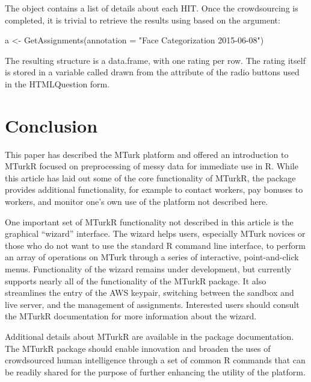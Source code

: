 \noindent The  object contains a list of details about each HIT. Once the crowdsourcing is completed, it is trivial to retrieve the results using  based on the  argument:

\begin{example}
a <- GetAssignments(annotation = "Face Categorization 2015-06-08")
\end{example}

\noindent The resulting structure is a data.frame, with one rating per row. The rating itself is stored in a variable called  drawn from the  attribute of the radio buttons used in the HTMLQuestion form.



\section{Conclusion}

This paper has described the MTurk platform and offered an introduction to MTurkR focused on preprocessing of messy data for immediate use in R. While this article has laid out some of the core functionality of MTurkR, the package provides additional functionality, for example to contact workers, pay bonuses to workers, and monitor one's own use of the platform not described here.

One important set of MTurkR functionality not described in this article is the graphical ``wizard'' interface. The wizard helps users, especially MTurk novices or those who do not want to use the standard R command line interface, to perform an array of operations on MTurk through a series of interactive, point-and-click menus. Functionality of the wizard remains under development, but currently supports nearly all of the functionality of the MTurkR package. It also streamlines the entry of the AWS keypair, switching between the sandbox and live server, and the management of assignments. Interested users should consult the MTurkR documentation for more information about the wizard.

Additional details about MTurkR are available in the package documentation. The MTurkR package should enable innovation and broaden the uses of crowdsourced human intelligence through a set of common R commands that can be readily shared for the purpose of further enhancing the utility of the platform.




\address{Thomas J. Leeper\\
Department of Government\\
London School of Economics and Political Science\\
London, United Kingdom}\\

